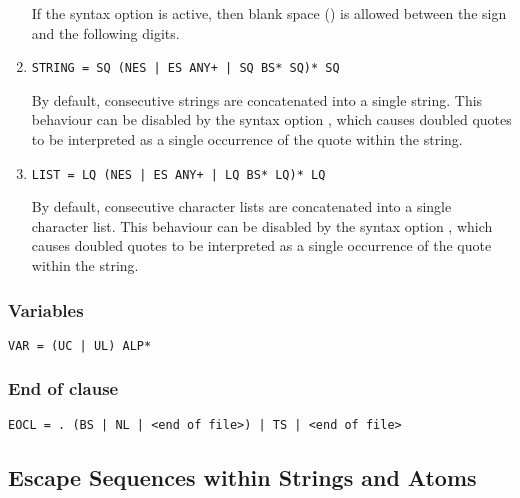 \begin{enumerate}
\begin{enumerate}
\end{enumerate}

If the syntax option  is active, then
blank space () is allowed between the sign and the following
digits.

\vfill\pagebreak %

\item{}
\begin{verbatim}
STRING = SQ (NES | ES ANY+ | SQ BS* SQ)* SQ
\end{verbatim}
By default, consecutive strings are concatenated into a single string.
This behaviour can be disabled by the syntax option
, which causes doubled quotes to be
interpreted as a single occurrence of the quote within the string.

\item{}
\begin{verbatim}
LIST = LQ (NES | ES ANY+ | LQ BS* LQ)* LQ
\end{verbatim}
By default, consecutive character lists are concatenated into a single character
list.
This behaviour can be disabled by the syntax option
, which causes doubled quotes to be
interpreted as a single occurrence of the quote within the string.
\end{enumerate}

\subsubsection{Variables}
\begin{verbatim}
VAR = (UC | UL) ALP*
\end{verbatim}

\subsubsection{End of clause}
\begin{verbatim}
EOCL = . (BS | NL | <end of file>) | TS | <end of file>
\end{verbatim}


\subsection{Escape Sequences within Strings and Atoms}

